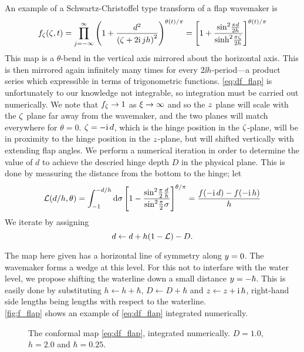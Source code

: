 An example of a Schwartz-Christoffel type transform of a flap wavemaker is
\begin{equation}
f_\zeta(\zeta,t) = \prod_{j=-\infty}^\infty \left(1+\frac{d^2}{\left(\zeta+2\mathrm{i}\, j h\right)^2}\right)^{\theta(t)/\pi}
= \left[1+\frac{\sin^2\!\frac{\pi d}{2h}}{\sinh^2\!\frac{\pi \zeta}{2h}}\right]^{\theta(t)/\pi}
\label{eq:df_flap}
\end{equation}
This map is a $\theta$-bend in the vertical axis mirrored about the horizontal axis.
This is then mirrored again infinitely many times for every $2\ii h$-period---a product series which expressible in terms of trigonometric functions.
\eqref{eq:df_flap} is unfortunately to our knowledge not integrable, so integration must be carried out numerically. 
We note that $f_\zeta\to1$ as $\xi\to\infty$ and so the $z$ plane will scale with the $\zeta$ plane far away from the wavemaker, and the two planes will match everywhere for $\theta=0$. $\zeta=-\mathrm{i}\, d$, which is the hinge position in the $\zeta$-plane, will be in proximity to the hinge position in the $z$-plane, but will shifted vertically with extending flap angles. We perform a numerical iteration in order to determine the value of $d$ to achieve the descried hinge depth $D$ in the physical plane. This is done by measuring the distance from the bottom to the hinge;
let
\begin{equation}
\mathcal L(d/h,\theta) = \int_{-1}^{-d/h} \mathrm d \sigma \left[1-\frac{\sin^2\!\frac{\pi}{2}\frac{d}{h}}{\sin^2\!\frac{\pi}{2}\sigma}\right]^{\theta/\pi} = \frac{f(-\mathrm{i}\, d)-f(-\mathrm{i}\, h)}h
\label{eq:L}
\end{equation}
We iterate by assigning
\[
d\leftarrow d + h(1-\mathcal L) - D.
\]

The map here given has a horizontal line of symmetry along $y=0$. The wavemaker forms a wedge at this level. 
For this not to interfare with the water level, we propose shifting the waterline down a small distance $y=-\hbar$.
This is easily done by substituting 
$h \leftarrow h + \hbar$, $D \leftarrow D + \hbar$ and $z \leftarrow z + \mathrm{i}\, \hbar$, right-hand side lengths being lengths with respect to the waterline.
\\

\autoref{fig:f_flap} shows an example of \eqref{eq:df_flap} integrated numerically.
\\
\begin{figure}[h!ptb]%
\centering
{}%
%
\caption{The conformal map \eqref{eq:df_flap}, integrated numerically.
$D=1.0$, $h=2.0$ and $\hbar = 0.25$.
}%
\label{fig:f_flap}%
\end{figure}



